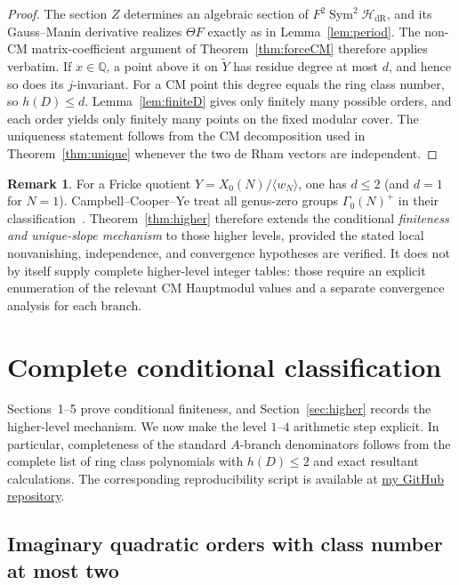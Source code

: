 \documentclass[11pt,a4paper]{amsart} %
\theoremstyle{definition}
\newtheorem{remark}[theorem]{Remark}
\newcommand{\Q}{\mathbb Q}
\newcommand{\Sym}{\operatorname{Sym}}
\newcommand{\dR}{\mathrm{dR}}
\begin{document}
\begin{proof}
The section \(Z\) determines an algebraic section of \(F^2\Sym^2\mathcal H_{\dR}\), and its Gauss--Manin derivative realizes $\Theta F$ exactly as in Lemma~\ref{lem:period}.  The non-CM matrix-coefficient argument of Theorem~\ref{thm:forceCM} therefore applies verbatim.  If $x\in\Q$, a point above it on $\widetilde Y$ has residue degree at most $d$, and hence so does its $j$-invariant.  For a CM point this degree equals the ring class number, so $h(D)\le d$.  Lemma~\ref{lem:finiteD} gives only finitely many possible orders, and each order yields only finitely many points on the fixed modular cover.  The uniqueness statement follows from the CM decomposition used in Theorem~\ref{thm:unique} whenever the two de Rham vectors are independent.
\end{proof}

\begin{remark}
For a Fricke quotient $Y=X_0(N)/\langle w_N\rangle$, one has $d\le2$ (and $d=1$ for $N=1$).  Campbell--Cooper--Ye treat all genus-zero groups $\Gamma_0(N)^+$ in their classification~\cite{CCY}.  Theorem~\ref{thm:higher} therefore extends the conditional \emph{finiteness and unique-slope mechanism} to those higher levels, provided the stated local nonvanishing, independence, and convergence hypotheses are verified.  It does not by itself supply complete higher-level integer tables: those require an explicit enumeration of the relevant CM Hauptmodul values and a separate convergence analysis for each branch.
\end{remark}

\section{Complete conditional classification}\label{sec:complete}

Sections~1--5 prove conditional finiteness, and Section~\ref{sec:higher}
records the higher-level mechanism. We now make the level \(1\)--\(4\)
arithmetic step explicit. In particular, completeness of the standard
\(A\)-branch denominators follows from the complete list of ring class
polynomials with \(h(D)\le2\) and exact resultant calculations. The
corresponding reproducibility script is available at
\href{https://github.com/Cwzx136/number-theory-calculations/blob/main/Ramanujan-Sato-series-list.py}{my GitHub repository}.

\subsection*{Imaginary quadratic orders with class number at most two}
\end{document}
